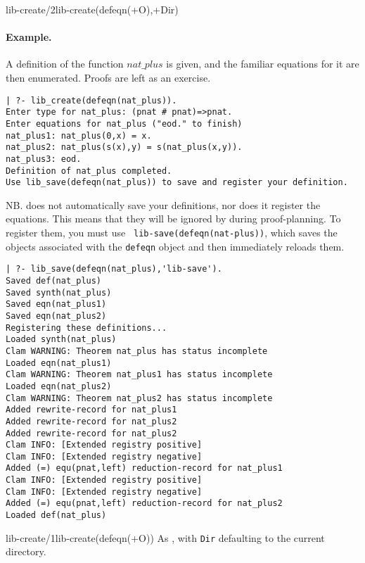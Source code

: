 \begin{predicate}{lib-create/2}{lib-create(defeqn(+O),+Dir)}
\paragraph {Example.}
 A definition of the function $nat\_plus$ is
given, and the familiar equations for it are then enumerated.  Proofs
are left as an exercise.

\begin{verbatim}
| ?- lib_create(defeqn(nat_plus)).
Enter type for nat_plus: (pnat # pnat)=>pnat.
Enter equations for nat_plus ("eod." to finish)
nat_plus1: nat_plus(0,x) = x.
nat_plus2: nat_plus(s(x),y) = s(nat_plus(x,y)).
nat_plus3: eod.
Definition of nat_plus completed.
Use lib_save(defeqn(nat_plus)) to save and register your definition.
\end{verbatim}

NB. \clam{} does not automatically save your definitions, nor does it
register the equations.  This means that they will be ignored by
\clam{} during proof-planning.  To register them, you must use {\tt
lib-save(defeqn(nat-plus))}, which saves the objects associated with
the {\tt defeqn} object and then immediately reloads them.

\begin{verbatim}
| ?- lib_save(defeqn(nat_plus),'lib-save').
Saved def(nat_plus)
Saved synth(nat_plus)
Saved eqn(nat_plus1)
Saved eqn(nat_plus2)
Registering these definitions...
Loaded synth(nat_plus)
Clam WARNING: Theorem nat_plus has status incomplete
Loaded eqn(nat_plus1)
Clam WARNING: Theorem nat_plus1 has status incomplete
Loaded eqn(nat_plus2)
Clam WARNING: Theorem nat_plus2 has status incomplete
Added rewrite-record for nat_plus1
Added rewrite-record for nat_plus2
Added rewrite-record for nat_plus2
Clam INFO: [Extended registry positive] 
Clam INFO: [Extended registry negative] 
Added (=) equ(pnat,left) reduction-record for nat_plus1
Clam INFO: [Extended registry positive] 
Clam INFO: [Extended registry negative] 
Added (=) equ(pnat,left) reduction-record for nat_plus2
Loaded def(nat_plus)
\end{verbatim}
\end{predicate}

\begin{predicate}{lib-create/1}{lib-create(defeqn(+O))}%
As , with {\tt Dir} defaulting to the current
directory.
\end{predicate}

